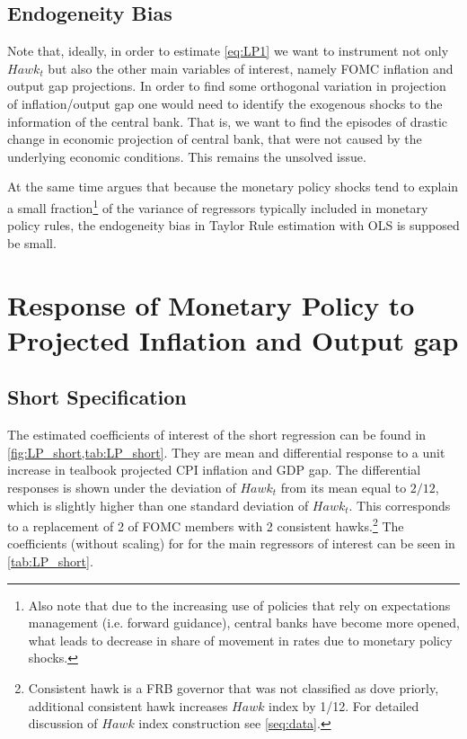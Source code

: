 \documentclass[11pt]{article}
\begin{document}
\subsection{Endogeneity Bias}

Note that, ideally, in order to estimate \vref{eq:LP1} we want to instrument not only $\mathit{Hawk}_{t}$ but also the other main variables of interest, namely FOMC inflation and output gap projections. 
In order to find some orthogonal variation in projection of inflation/output gap one would need to identify the exogenous shocks to the information of the central bank. 
That is, we want to find the episodes of drastic change in economic projection of central bank, that were not caused by the underlying economic conditions. 
This remains the unsolved issue.

At the same time \citet{Carvalho2021} argues that because the monetary policy shocks tend to explain a small fraction\footnote{Also note that due to the increasing use of policies that rely on expectations management (i.e. forward guidance), central banks have become more opened, what leads to decrease in share of movement in rates due to monetary policy shocks.} of the variance of regressors typically included in monetary policy rules, the endogeneity bias in Taylor Rule estimation with OLS is supposed be small.

\section{Response of Monetary Policy to Projected Inflation and Output gap}



\subsection{Short Specification}

The estimated coefficients of interest of the short regression can be found in \vref{fig:LP_short,tab:LP_short}. 
They are mean and differential response to a unit increase in tealbook projected CPI inflation and GDP gap. 
The differential responses is shown under the deviation of $\mathit{Hawk}_t$ from its mean equal to $2/12$, which is slightly higher than one standard deviation of $\mathit{Hawk}_t$. 
This corresponds to a replacement of 2 of FOMC members with 2 consistent hawks.\footnote{Consistent hawk is a FRB governor that was not classified as dove priorly, additional consistent hawk increases $\mathit{Hawk}$ index by 1/12. For detailed discussion of $\mathit{Hawk}$ index construction see \vref{seq:data}.}
The coefficients (without scaling) for for the main regressors of interest can be seen in \vref{tab:LP_short}. 
\end{document}
